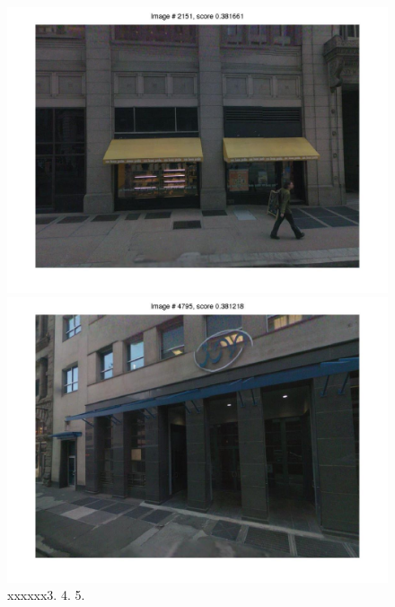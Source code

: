 \documentclass[10pt,onecolumn,A4]{article}
\begin{document}
\begin{figure}
\begin{minipage}{0.45\linewidth}
		\colorbox{myCopper4}{\includegraphics[trim = 55mm 40mm 55mm 30mm, clip=true,width=0.30\linewidth]{sup1962/svm04.jpg}}
		\colorbox{myCopper5}{\includegraphics[trim = 55mm 40mm 55mm 30mm, clip=true,width=0.30\linewidth]{sup1962/svm05.jpg}}  \\
		\textcolor{myWhite}{xxxxxx}3. \hspace{0.25\linewidth}4. \hspace{0.25\linewidth}5. \\
	\end{minipage}
\end{figure}
\end{document}
